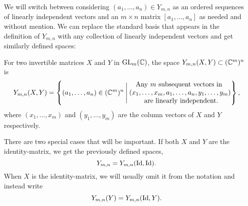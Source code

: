 We will switch between considering $(a_1,\dots,a_n)\in Y_{m,n}$ as an
ordered sequences of linearly independent vectors and an $m\times n$
matrix $[a_1,\dots,a_n]$ as needed and without mention. We can replace
the standard basis that appears in the definition of $Y_{m,n}$ with
any collection of linearly independent vectors and get similarly
defined spaces: 
\begin{definition}
  \label{def:rum}
  For two invertible matrices $X$ and $Y$ in
  $\operatorname{GL}_m(\mathbb{C})$, the space \newline
  $Y_{m,n}(X,Y) \subset (\mathbb{C}^{m})^{n}$ is
  \[ Y_{m,n}(X,Y) = \left\{ (a_1,\dots,a_n) \in (\mathbb{C}^m)^n
    \:\Bigg\vert\: 
    \begin{matrix}
      \text{Any } m \text{ subsequent vectors in } \\
      (x_1,\dots,x_m,a_1,\dots,a_n,y_1,\dots,y_m) \\
      \text{ are linearly independent.}
    \end{matrix}  \right\}, \]
  where $(x_1,\dots,x_m)$ and $(y_1,\dots,y_m)$ are the column vectors
  of $X$ and $Y$ respectively.
  
  There are two special cases that will be important.
  If both $X$ and $Y$ are the identity-matrix, we get the previously
  defined spaces,
  \[ Y_{m,n} = Y_{m,n}(\operatorname{Id},\operatorname{Id}). \]
  When $X$ is the identity-matrix, we will usually omit it from the
  notation and instead write
  \[ Y_{m,n}(Y) = Y_{m,n}(\operatorname{Id},Y). \]
\end{definition}

